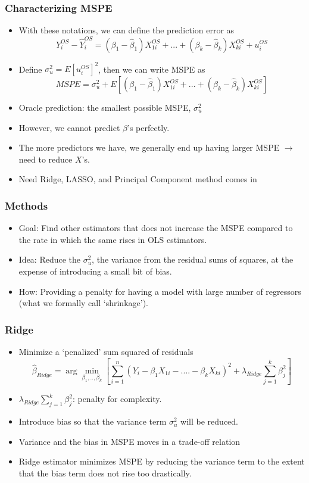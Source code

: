 \documentclass[aspectratio=169]{beamer}
\begin{document}
\begin{frame}
\frametitle{Characterizing MSPE}
\begin{itemize}
\item With these notations, we can define the prediction error as
\[
Y_i^{OS}-\hat{Y}_i^{OS}=(\beta_1-\hat{\beta}_1)X^{OS}_{1i}+...+(\beta_k-\hat{\beta}_k)X^{OS}_{ki}+u_i^{OS}
\]
\item Define $\sigma_u^2=E[u_i^{OS}]^2$, then we can write MSPE as
\[
MSPE=\sigma_u^2+ E[(\beta_1-\hat{\beta}_1)X^{OS}_{1i}+...+(\beta_k-\hat{\beta}_k)X^{OS}_{ki}]
\]
\item Oracle prediction: the smallest possible MSPE, $\sigma_u^2$
\item However,  we cannot predict $\beta$'s perfectly.
\item The more predictors we have, we generally end up having larger MSPE $\to$ need to reduce $X$'s. 
\item Need Ridge, LASSO, and Principal Component method comes in

\end{itemize}
\end{frame}


\begin{frame}
\frametitle{Methods}
\begin{itemize}
\item Goal: Find other estimators that does not increase the MSPE compared to the rate in which the same rises in OLS estimators. 
\item Idea: Reduce the $\sigma_u^2$, the variance from the residual sums of squares, at the expense of introducing a small bit of bias. 
\item How: Providing a penalty for having a model with large number of regressors (what we formally call `shrinkage'). 
\end{itemize}
\end{frame}

\begin{frame}
\frametitle{Ridge}
\begin{itemize}
\item Minimize a `penalized' sum squared of residuals
\[
\hat{\beta}_{Ridge}=\arg\min_{\beta_1,..,\beta_k}\left[ \sum_{i=1}^n(Y_i - \beta_1X_{1i}-....-\beta_kX_{ki})^2 + \lambda_{Ridge}\sum_{j=1}^k\beta_j^2\right]
\]
\item $\lambda_{Ridge}\sum_{j=1}^k\beta_j^2$: penalty for complexity. 
\item Introduce bias so that the variance term $\sigma_u^2$ will be reduced.
\item Variance and the bias in MSPE moves in a trade-off relation 
\item Ridge estimator minimizes MSPE by reducing the variance term to the extent that the bias term does not rise too drastically. 
\end{itemize}
\end{frame}
\end{document}
